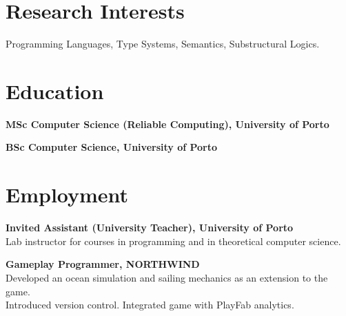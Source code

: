 \documentclass[11pt,a4paper]{moderncv}
\begin{document}
\makecvtitle%

\vspace*{-3em}%


\section{Research Interests}

Programming Languages, Type Systems, Semantics, Substructural Logics.


\section{Education}

\begin{description}[labelwidth=60pt,align=right,leftmargin=!]
    \item[\normalfont{\emph{2019 -- 2023}}] \textbf{MSc Computer Science (Reliable Computing), University of Porto}
    \item[\normalfont{\emph{2016 -- 2019}}] \textbf{BSc Computer Science, University of Porto}
\end{description}


\section{Employment}

\begin{description}[labelwidth=60pt,align=right,leftmargin=!]
    \item[\normalfont{\emph{2023 -- now}}] \textbf{Invited Assistant (University Teacher), University of Porto}
    \\ \small{Lab instructor for courses in programming and in theoretical computer science.}
    \item[\normalfont{\emph{2021 -- 2022}}] \textbf{Gameplay Programmer, NORTHWIND}
    \\ \small{Developed an ocean simulation and sailing mechanics as an extension to the game.}
    \\ \small{Introduced version control. Integrated game with PlayFab analytics.}
\end{description}
\end{document}

